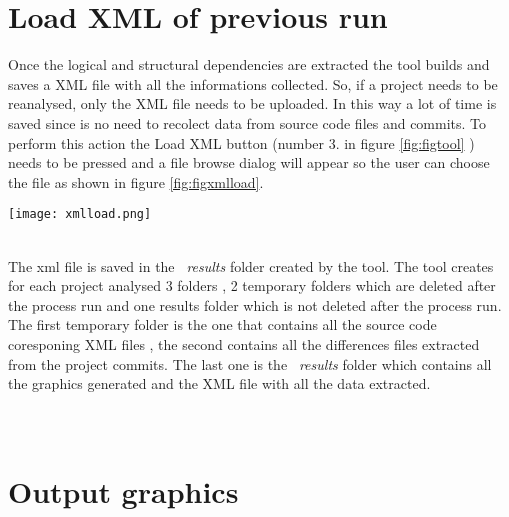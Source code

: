 \section{Load XML of previous run}
\tab Once the logical and structural dependencies are extracted the tool builds and saves a XML file with all the informations collected. So, if a project needs to be reanalysed, only the XML file needs to be uploaded. In this way a lot of time is saved since is no need to recolect data from source code files and commits. To perform this action the Load XML button (number 3. in figure \ref{fig:figtool} ) needs to be pressed and a file browse dialog will appear so the user can choose the file as shown in figure \ref{fig:figxmlload}.
\begin{figure*}[h]
\centering
\texttt{[image: xmlload.png]}
\caption{Loading a XML of a previous run.}
\label{fig:figxmlload}
\end{figure*}
\\
\tab The xml file is saved in the \textit{~results} folder created by the tool. The tool creates for each project analysed 3 folders , 2 temporary folders which are deleted after the process run and one results folder which is not deleted after the process run. The first temporary folder is the one that contains all the source code coresponing XML files , the second contains all the differences files extracted from the project commits. The last one is the \textit{~results} folder which contains all the graphics generated and the XML file with all the data extracted.
\\
\\
\\
\section{Output graphics}
 
